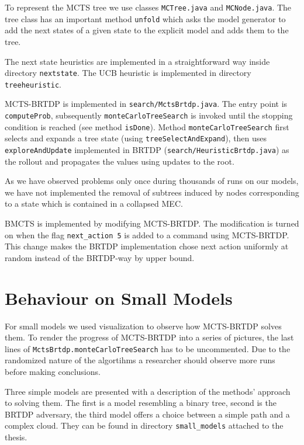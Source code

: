 To represent the MCTS tree we use classes \verb|MCTree.java| and
\linebreak
\verb|MCNode.java|. The tree class has an important method \verb|unfold|
which asks the model generator to add the next states of a given state
to the explicit model and adds them to the tree.

The next state heuristics are implemented in a straightforward way
inside directory \verb|nextstate|. The UCB heuristic is implemented in
directory \verb|treeheuristic|.

MCTS-BRTDP is implemented in \verb|search/MctsBrtdp.java|. The entry
point is \verb|computeProb|, subsequently
\verb|monteCarloTreeSearch| is invoked until the stopping condition
is reached (see method \verb|isDone|). Method
\verb|monteCarloTreeSearch| first selects and expands a tree state
(using \verb|treeSelectAndExpand|),
then uses \verb|exploreAndUpdate| implemented in BRTDP
(\verb|search/HeuristicBrtdp.java|) as the rollout and propagates
the values using updates to the root.

As we have observed problems only once during thousands of runs on our
models, we have not implemented the removal of subtrees induced by nodes
corresponding to a state which is contained in a collapsed MEC.

BMCTS is implemented by modifying MCTS-BRTDP. The modification is turned
on when the flag \verb|next_action 5| is added to a command using
MCTS-BRTDP. This change makes the BRTDP implementation chose next action
uniformly at random instead of the BRTDP-way by upper bound.

\section{Behaviour on Small Models}

For small models we used visualization to observe how MCTS-BRTDP solves
them. To render the progress of MCTS-BRTDP into a series of pictures,
the last lines of \verb|MctsBrtdp.monteCarloTreeSearch| has to be uncommented.
Due to the randomized nature of the algortihms a researcher should
observe more runs before making conclusions.

Three simple models are presented with a description of the methods'
approach to solving them.
The first is a model resembling a binary tree, second is
the BRTDP adversary, the third model offers a choice between a simple
path and a complex cloud. They can be found in directory
\verb|small_models| attached to the thesis.

